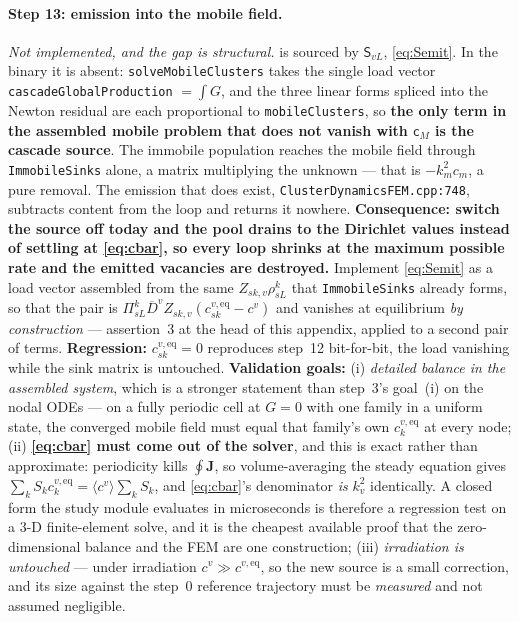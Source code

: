 \documentclass{article}
\newcommand{\spvec}[1]{\bm{\mathsf{#1}}}   %
\newcommand{\code}[1]{\texttt{#1}}
\begin{document}
\paragraph{Step 13: emission into the mobile field.} \emph{Not implemented, and
the gap is structural.}  is sourced by $\spvec S_{vL}$,
\cref{eq:Semit}. In the binary it is absent: \code{solveMobileClusters} takes the
single load vector \code{cascadeGlobalProduction} $=\int G$, and the three linear
forms spliced into the Newton residual are each proportional to
\code{mobileClusters}, so \textbf{the only term in the assembled mobile problem
that does not vanish with $\spvec c_M$ is the cascade source}. The immobile
population reaches the mobile field through \code{ImmobileSinks} alone, a matrix
multiplying the unknown --- that is $-k^2_mc_m$, a pure removal. The emission that
does exist, \code{ClusterDynamicsFEM.cpp:748}, subtracts content from the loop and
returns it nowhere. \textbf{Consequence: switch the source off today and the pool
drains to the Dirichlet values instead of settling at \cref{eq:cbar}, so every
loop shrinks at the maximum possible rate and the emitted vacancies are
destroyed.} Implement \cref{eq:Semit} as a load vector assembled from the same
$Z_{sk,v}\rho^k_{sL}$ that \code{ImmobileSinks} already forms, so that the pair is
$\Pi^k_{sL}\overline D^{v}Z_{sk,v}(c^{v,\mathrm{eq}}_{sk}-c^{v})$ and vanishes at
equilibrium \emph{by construction} --- assertion~3 at the head of this appendix,
applied to a second pair of terms.
\textbf{Regression:} $c^{v,\mathrm{eq}}_{sk}=0$ reproduces step~12 bit-for-bit,
the load vanishing while the sink matrix is untouched.
\textbf{Validation goals:} (i) \emph{detailed balance in the assembled system},
which is a stronger statement than step~3's goal~(i) on the nodal ODEs --- on a
fully periodic cell at $G=0$ with one family in a uniform state, the converged
mobile field must equal that family's own $c^{v,\mathrm{eq}}_k$ at every node;
(ii) \textbf{\cref{eq:cbar} must come out of the solver}, and this is exact rather
than approximate: periodicity kills $\oint\bm J$, so volume-averaging the steady
equation gives $\sum_kS_kc^{v,\mathrm{eq}}_k=\langle c^v\rangle\sum_kS_k$, and
\cref{eq:cbar}'s denominator \emph{is} $k^2_v$ identically. A closed form the
study module evaluates in microseconds is therefore a regression test on a
$3$-D finite-element solve, and it is the cheapest available proof that the
zero-dimensional balance and the FEM are one construction; (iii) \emph{irradiation
is untouched} --- under irradiation $c^v\gg c^{v,\mathrm{eq}}$, so the new source
is a small correction, and its size against the step~0 reference trajectory must
be \emph{measured} and not assumed negligible.
\end{document}
